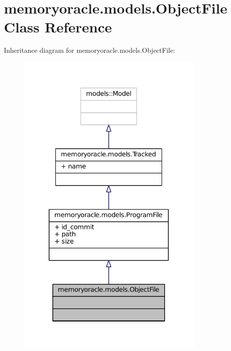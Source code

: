 \hypertarget{classmemoryoracle_1_1models_1_1ObjectFile}{}\section{memoryoracle.\+models.\+Object\+File Class Reference}
\label{classmemoryoracle_1_1models_1_1ObjectFile}


Inheritance diagram for memoryoracle.\+models.\+Object\+File\+:\nopagebreak
\begin{figure}[H]
\begin{center}
\leavevmode
\includegraphics[width=264pt]{classmemoryoracle_1_1models_1_1ObjectFile__inherit__graph}
\end{center}
\end{figure}


